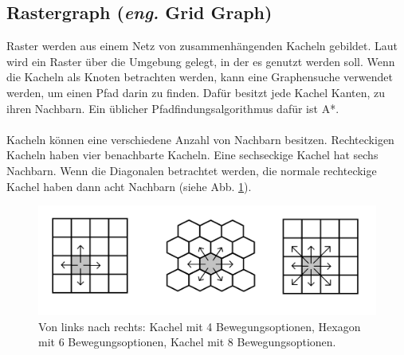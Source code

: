 \subsection{Rastergraph (\textit{eng.} Grid Graph)}
Raster werden aus einem Netz von zusammenhängenden Kacheln gebildet.
Laut \cite{Grid:02} wird ein Raster über die Umgebung gelegt, in der es genutzt werden soll.
Wenn die Kacheln als Knoten betrachten werden, kann eine Graphensuche verwendet werden, um einen Pfad darin zu finden.
Dafür besitzt jede Kachel Kanten, zu ihren Nachbarn. 
Ein üblicher Pfadfindungsalgorithmus dafür ist A*.
\\\\
Kacheln können eine verschiedene Anzahl von Nachbarn besitzen.
Rechteckigen Kacheln haben vier benachbarte Kacheln.
Eine sechseckige Kachel hat sechs Nachbarn. Wenn die Diagonalen betrachtet werden, die normale rechteckige Kachel haben dann acht Nachbarn (siehe Abb. \ref{sec2a}).
\begin{figure} %
	\centering
	\includegraphics[width=\textwidth]{images/Grid_Tiles.png}
	\caption{Von links nach rechts: Kachel mit 4 Bewegungsoptionen, Hexagon mit 6 Bewegungsoptionen, Kachel mit 8 Bewegungsoptionen.}
	\label{sec2a}
\end{figure}


